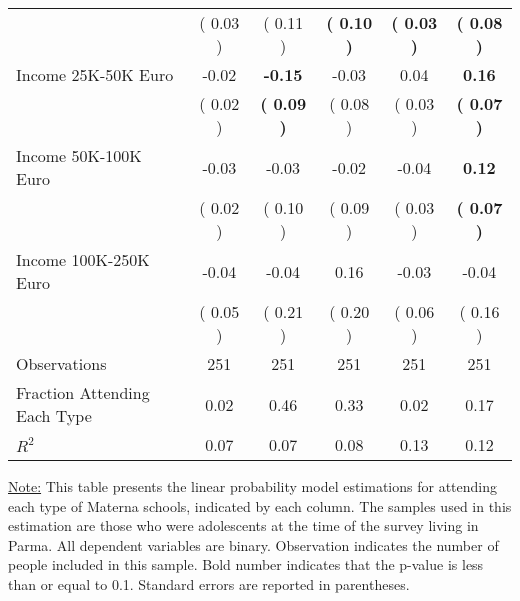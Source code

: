 \begin{table}[H]
{\begin{tabular}{lccccc}
\quad  & (     0.03 ) & (     0.11 )  & \textbf{(     0.10 )}  & \textbf{(     0.03 )} & \textbf{(     0.08 )} \\
\quad Income 25K-50K Euro &     -0.02 & \textbf{    -0.15} &     -0.03 &      0.04 & \textbf{     0.16} \\
\quad  & (     0.02 ) & \textbf{(     0.09 )}  & (     0.08 )  & (     0.03 ) & \textbf{(     0.07 )} \\
\quad Income 50K-100K Euro &     -0.03 &     -0.03 &     -0.02 &     -0.04 & \textbf{     0.12} \\
\quad  & (     0.02 ) & (     0.10 )  & (     0.09 )  & (     0.03 ) & \textbf{(     0.07 )} \\
\quad Income 100K-250K Euro &     -0.04 &     -0.04 &      0.16 &     -0.03 &     -0.04 \\
\quad  & (     0.05 ) & (     0.21 )  & (     0.20 )  & (     0.06 ) & (     0.16 ) \\
\midrule
Observations & 251 & 251 & 251 & 251 & 251 \\
Fraction Attending Each Type &      0.02 &      0.46 &      0.33 &      0.02 &      0.17 \\
\midrule
$ R^2$ &      0.07 &      0.07 &      0.08 &      0.13 &      0.12 \\
\bottomrule
\end{tabular}}
\end{table}
\begin{scriptsize}
\noindent\underline{Note:} This table presents the linear probability model estimations for attending each type of Materna schools, indicated by each column. The samples used in this estimation are those who were adolescents at the time of the survey living in Parma. All dependent variables are binary. Observation indicates the number of people included in this sample. Bold number indicates that the p-value is less than or equal to 0.1. Standard errors are reported in parentheses.
\end{scriptsize}

